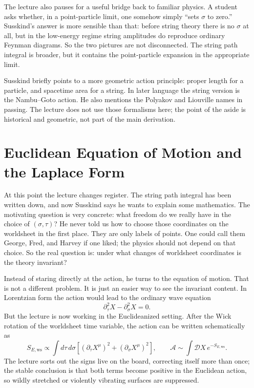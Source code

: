 The lecture also pauses for a useful bridge back to familiar physics. A student asks whether, in a point-particle limit, one somehow simply ``sets \(\sigma\) to zero.'' Susskind's answer is more sensible than that: before string theory there is no \(\sigma\) at all, but in the low-energy regime string amplitudes do reproduce ordinary Feynman diagrams. So the two pictures are not disconnected. The string path integral is broader, but it contains the point-particle expansion in the appropriate limit.

\begin{remark}
Susskind briefly points to a more geometric action principle: proper length for a particle, and spacetime area for a string. In later language the string version is the Nambu--Goto action. He also mentions the Polyakov and Liouville names in passing. The lecture does not use those formalisms here; the point of the aside is historical and geometric, not part of the main derivation.
\end{remark}

\section{Euclidean Equation of Motion and the Laplace Form}

At this point the lecture changes register. The string path integral has been written down, and now Susskind says he wants to explain some mathematics. The motivating question is very concrete: what freedom do we really have in the choice of \((\sigma,\tau)\)? He never told us how to choose those coordinates on the worldsheet in the first place. They are only labels of points. One could call them George, Fred, and Harvey if one liked; the physics should not depend on that choice. So the real question is: under what changes of worldsheet coordinates is the theory invariant?

Instead of staring directly at the action, he turns to the equation of motion. That is not a different problem. It is just an easier way to see the invariant content. In Lorentzian form the action would lead to the ordinary wave equation
\begin{equation}
\partial_\tau^2 X-\partial_\sigma^2 X=0.
\end{equation}
But the lecture is now working in the Euclideanized setting. After the Wick rotation of the worldsheet time variable, the action can be written schematically as
\begin{equation}
S_{E,\mathrm{ws}}
\propto
\int d\tau\,d\sigma
\left[
\left(\partial_\tau X^\mu\right)^2
+
\left(\partial_\sigma X^\mu\right)^2
\right],
\qquad
\mathcal{A}\sim \int \mathcal{D}X\,e^{-S_{E,\mathrm{ws}}}.
\end{equation}
The lecture sorts out the signs live on the board, correcting itself more than once; the stable conclusion is that both terms become positive in the Euclidean action, so wildly stretched or violently vibrating surfaces are suppressed.

